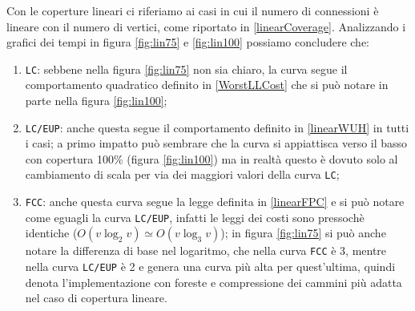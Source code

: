 Con le coperture lineari ci riferiamo ai casi in cui il numero di connessioni è lineare con il numero di vertici, come riportato in \eqref{linearCoverage}.
Analizzando i grafici dei tempi in figura \ref{fig:lin75} e \ref{fig:lin100} possiamo concludere che:
\begin{enumerate}
    \item \texttt{LC}: sebbene nella figura \ref{fig:lin75} non sia chiaro, la curva segue il comportamento quadratico definito in \eqref{WorstLLCost}
          che si può notare in parte nella figura \ref{fig:lin100};
    \item \texttt{LC/EUP}: anche questa segue il comportamento definito in \eqref{linearWUH} in tutti i casi; a primo impatto può sembrare
          che la curva si appiattisca verso il basso con copertura 100\% (figura \ref{fig:lin100}) ma in realtà questo è dovuto solo al
          cambiamento di scala per via dei maggiori valori della curva \texttt{LC};
    \item \texttt{FCC}: anche questa curva segue la legge definita in \eqref{linearFPC} e si può notare come
          eguagli la curva \texttt{LC/EUP}, infatti le leggi dei costi sono pressochè identiche ($O(v\log_2v) \simeq O(v\log_3v)$); in figura
          \ref{fig:lin75} si può anche notare la differenza di base nel logaritmo, che nella curva \texttt{FCC} è 3, mentre nella curva
          \texttt{LC/EUP} è 2 e genera una curva più alta per quest'ultima, quindi denota l'implementazione con foreste e compressione
          dei cammini più adatta nel caso di copertura lineare.
\end{enumerate}

